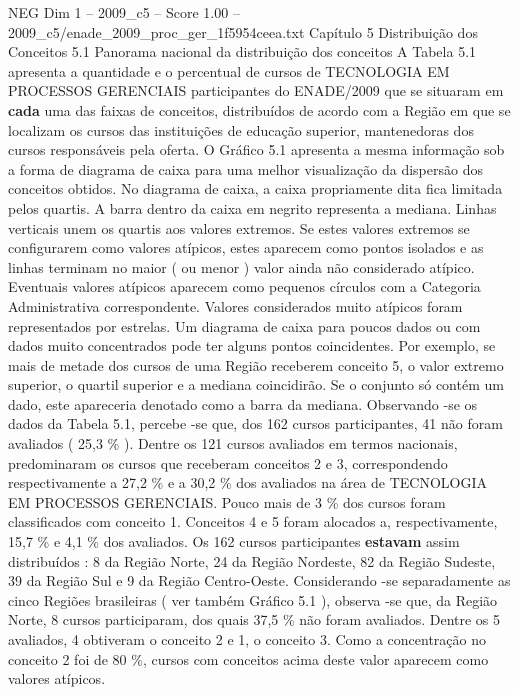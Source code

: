 \begin{textsample}{NEG Dim 1 – 2009\_c5 – Score 1.00 – 2009\_c5/enade\_2009\_proc\_ger\_1f5954ceea.txt}  \label{ex:f1_neg_296}
Capítulo 5 Distribuição dos Conceitos 5.1 Panorama nacional da distribuição dos conceitos A Tabela 5.1 apresenta a quantidade e o percentual de cursos de TECNOLOGIA EM PROCESSOS GERENCIAIS participantes do ENADE/2009 que se situaram em \textbf{cada} uma das faixas de conceitos, distribuídos de acordo com a Região em que se localizam os cursos das instituições de educação superior, mantenedoras dos cursos responsáveis pela oferta.
O Gráfico 5.1 apresenta a mesma informação sob a forma de diagrama de caixa para uma melhor visualização da dispersão dos conceitos obtidos.
No diagrama de caixa, a caixa propriamente dita fica limitada pelos quartis.
A barra dentro da caixa em negrito representa a mediana.
Linhas verticais unem os quartis aos valores extremos.
Se estes valores extremos se configurarem como valores atípicos, estes aparecem como pontos isolados e as linhas terminam no maior ( ou menor ) valor ainda não considerado atípico.
Eventuais valores atípicos aparecem como pequenos círculos com a Categoria Administrativa correspondente.
Valores considerados muito atípicos foram representados por estrelas.
Um diagrama de caixa para poucos dados ou com dados muito concentrados pode ter alguns pontos coincidentes.
Por exemplo, se mais de metade dos cursos de uma Região receberem conceito 5, o valor extremo superior, o quartil superior e a mediana coincidirão.
Se o conjunto só contém um dado, este apareceria denotado como a barra da mediana.
Observando -se os dados da Tabela 5.1, percebe -se que, dos 162 cursos participantes, 41 não foram avaliados ( 25,3 \% ).
Dentre os 121 cursos avaliados em termos nacionais, predominaram os cursos que receberam conceitos 2 e 3, correspondendo respectivamente a 27,2 \% e a 30,2 \% dos avaliados na área de TECNOLOGIA EM PROCESSOS GERENCIAIS.
Pouco mais de 3 \% dos cursos foram classificados com conceito 1.
Conceitos 4 e 5 foram alocados a, respectivamente, 15,7 \% e 4,1 \% dos avaliados.
Os 162 cursos participantes \textbf{estavam} assim distribuídos : 8 da Região Norte, 24 da Região Nordeste, 82 da Região Sudeste, 39 da Região Sul e 9 da Região Centro-Oeste.
Considerando -se separadamente as cinco Regiões brasileiras ( ver também Gráfico 5.1 ), observa -se que, da Região Norte, 8 cursos participaram, dos quais 37,5 \% não foram avaliados.
Dentre os 5 avaliados, 4 obtiveram o conceito 2 e 1, o conceito 3.
Como a concentração no conceito 2 foi de 80 \%, cursos com conceitos acima deste valor aparecem como valores atípicos.

\end{textsample}
